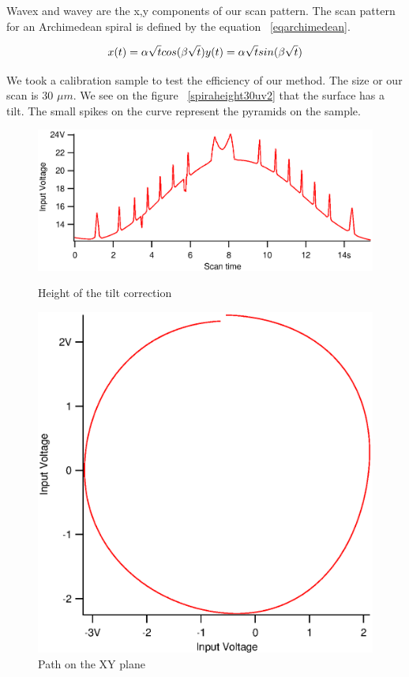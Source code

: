 Wavex and wavey are the x,y components of our scan pattern. The scan pattern for an Archimedean spiral is defined by the equation  ~\ref{eqarchimedean}.

\begin{equation}\label{eqarchimedean}
x(t)= \alpha \sqrt{t} cos(\beta \sqrt{t})\\
y(t)= \alpha \sqrt{t} sin(\beta \sqrt{t})
\end{equation}

We took a calibration sample to test the efficiency of our method. The size or our scan is 30 $\mu m$. We see on the figure  ~\ref{spiraheight30uv2} that the surface has a tilt. The small spikes on the curve represent the pyramids on the sample.

\begin{figure}[!ht]
\begin{minipage}[b]{0.45\linewidth}
\centering
\includegraphics[width=\textwidth]{images/spiraheight30uv2.eps}
\caption{Height of the tilt correction}
\label{spiraheight30uv2}
\end{minipage}
\hspace{0.5cm}
\begin{minipage}[b]{0.45\linewidth}
\centering
\includegraphics[width=\textwidth]{images/xsenvsysen30u.eps}
\caption{Path on the XY plane}
\label{xsenvsysen30u}
\end{minipage}
\end{figure}

